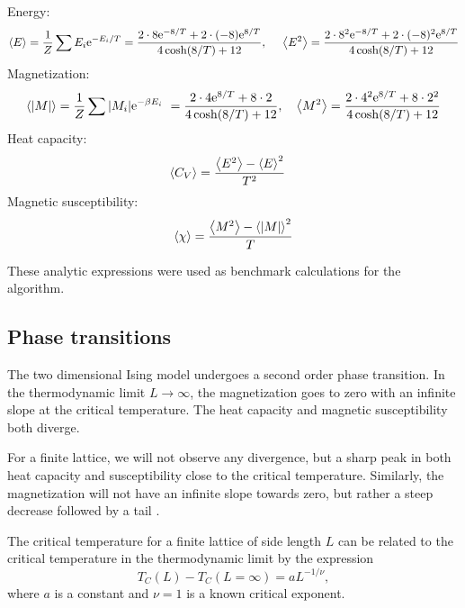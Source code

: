 \documentclass[a4paper,10pt,onecolumn]{article}
\newcommand{\e}[1]{\mathrm{e}^{#1}}	%
\begin{document}
Energy:
\begin{align*}
\expval{E} = \frac{1}{Z}\sum E_i\e{-E_i/T} = \frac{2\cdot8\e{-8/T}+2\cdot(-8)\e{8/T}}{4\cosh(8/T)+12}
\qcomma \expval{E^2} = \frac{2\cdot8^2\e{-8/T}+2\cdot(-8)^2\e{8/T}}{4\cosh(8/T)+12}
\end{align*}
Magnetization: 
\[
\expval{\abs{M}} = \frac{1}{Z}\sum \abs{M_i}\e{-\beta E_i} = \frac{2\cdot4\e{8/T} + 8\cdot2}{4\cosh(8/T)+12}
\qcomma
\expval{M^2} = \frac{2\cdot4^2\e{8/T} + 8\cdot2^2}{4\cosh(8/T) + 12}
\]
Heat capacity:
\begin{align*}
\expval{C_V} &= \frac{\expval{E^2}-\expval{E}^2}{T^2} 
\end{align*}
Magnetic susceptibility:
\[
\expval{\chi} = \frac{\expval{M^2} - \expval{\abs{M}}^2}{T}  
\]

These analytic expressions were used as benchmark calculations for the algorithm. 

\subsection{Phase transitions}
The two dimensional Ising model undergoes a second order phase transition. In the thermodynamic limit $L\to\infty$, the magnetization goes to zero with an infinite slope at the critical temperature. 
The heat capacity and magnetic susceptibility  both diverge. \cite{lecture}

For a finite lattice, we will not observe any divergence, but a sharp peak in both heat capacity and susceptibility close to the critical temperature. Similarly, the magnetization will not have an infinite slope towards zero, but rather a steep decrease followed by a tail \cite{lecture}.

The critical temperature for a finite lattice of side length $L$ can be related to the critical temperature in the thermodynamic limit by the expression \cite{lecture}
\begin{equation}\label{eq:Tc}
T_C(L) - T_C(L=\infty) = aL^{-1/\nu},
\end{equation}
where $a$ is a constant and $\nu=1$ is a known critical exponent. 
\end{document}
